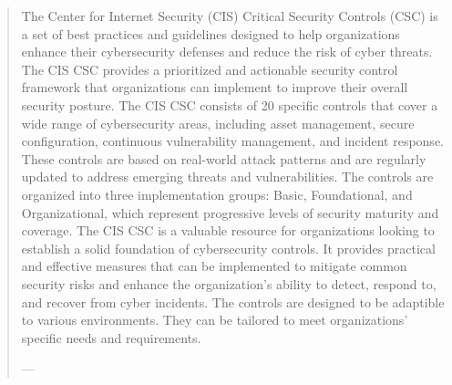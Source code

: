\begin{formal}
          
          \begin{quote}
          
                    The Center for Internet Security (CIS) Critical Security Controls (CSC) is a set of best practices and guidelines designed to help organizations enhance their cybersecurity defenses and reduce the risk of cyber threats. The CIS CSC provides a prioritized and actionable security control framework that organizations can implement to improve their overall security posture. The CIS CSC consists of 20 specific controls that cover a wide range of cybersecurity areas, including asset management, secure configuration, continuous vulnerability management, and incident response. These controls are based on real-world attack patterns and are regularly updated to address emerging threats and vulnerabilities. The controls are organized into three implementation groups: Basic, Foundational, and Organizational, which represent progressive levels of security maturity and coverage. The CIS CSC is a valuable resource for organizations looking to establish a solid foundation of cybersecurity controls. It provides practical and effective measures that can be implemented to mitigate common security risks and enhance the organization's ability to detect, respond to, and recover from cyber incidents. The controls are designed to be adaptible to various environments. They can be tailored to meet organizations' specific needs and requirements.
                    
                    \begin{flushright}
                            ---\cite{boyle2023}
                    \end{flushright}
                    
          \end{quote}
          
\end{formal}